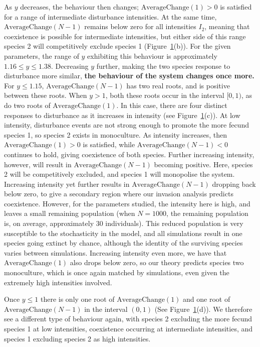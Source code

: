 \begin{figure}[htbp]
\label{linked}
\end{figure}

As $y$ decreases, the behaviour then changes; $\text{AverageChange}(1)>0$ is satisfied for a range of intermediate disturbance intensities. At the same time, $\text{AverageChange}(N-1)$ remains below zero for all intensities $I_2$, meaning that coexistence is possible for intermediate intensities, but either side of this range species 2 will competitively exclude species 1 (Figure~\ref{linked}(b)). For the given parameters, the range of $y$ exhibiting this behaviour is approximately $1.16 \leq y \leq 1.38$. Decreasing $y$ further, making the two species response to disturbance more similar, \textbf{the behaviour of the system changes once more.} For $y\leq 1.15$, $\text{AverageChange}(N-1)$ has two real roots, and is positive between these roots. When $y>1$, both these roots occur in the interval $[0,1)$, as do two roots of $\text{AverageChange}(1)$. In this case, there are four distinct responses to disturbance as it increases in intensity (see Figure~\ref{linked}(c)). At low intensity, disturbance events are not strong enough to promote the more fecund species 1, so species 2 exists in monoculture. As intensity increases, then $\text{AverageChange}(1)>0$ is satisfied, while $\text{AverageChange}(N-1)<0$ continues to hold, giving coexistence of both species. Further increasing intensity, however, will result in $\text{AverageChange}(N-1)$ becoming positive. Here, species 2 will be competitively excluded, and species 1 will monopolise the system. Increasing intensity yet further results in $\text{AverageChange}(N-1)$ dropping back below zero, to give a secondary region where our invasion analysis predicts coexistence. However, for the parameters studied, the intensity here is high, and leaves a small remaining population (when $N=1000$, the remaining population is, on average, approximately 30 individuals). This reduced population is very susceptible to the stochasticity in the model, and all simulations result in one species going extinct by chance, although the identity of the surviving species varies between simulations. Increasing intensity even more, we have that $\text{AverageChange}(1)$ also drops below zero, so our theory predicts species two monoculture, which is once again matched by simulations, even given the extremely high intensities involved.

Once $y\leq 1$ there is only one root of $\text{AverageChange}(1)$ and one root of $\text{AverageChange}(N-1)$ in the interval $(0,1)$ (See Figure~\ref{linked}(d)). We therefore see a different type of behaviour again, with species 2 excluding the more fecund species 1 at low intensities, coexistence occurring at intermediate intensities, and species 1 excluding species 2 as high intensities.

